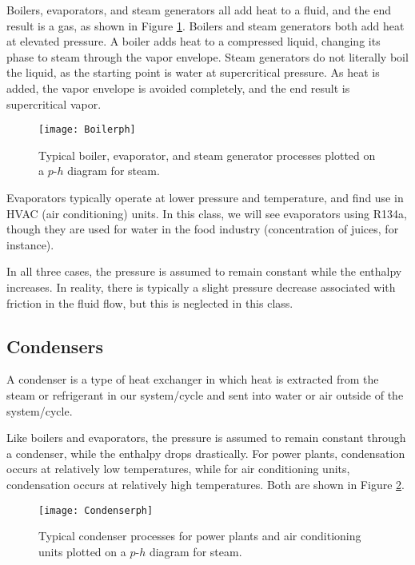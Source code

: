 Boilers, evaporators, and steam generators all add heat to a fluid, and the end result is a gas, as shown in Figure \ref{fig:ch4_boilerph}.  Boilers and steam generators both add heat at elevated pressure.  A boiler adds heat to a compressed liquid, changing its phase to steam through the vapor envelope.  Steam generators do not literally boil the liquid, as the starting point is water at supercritical pressure.  As heat is added, the vapor envelope is avoided completely, and the end result is supercritical vapor.

\begin{figure}[H]
\centering
\texttt{[image: Boilerph]}
\caption{Typical boiler, evaporator, and steam generator processes plotted on a $p$-$h$ diagram for steam.}
\label{fig:ch4_boilerph}
\end{figure}

Evaporators typically operate at lower pressure and temperature, and find use in HVAC (air conditioning) units.  In this class, we will see evaporators using R134a, though they are used for water in the food industry (concentration of juices, for instance).

In all three cases, the pressure is assumed to remain constant while the enthalpy increases.  In reality, there is typically a slight pressure decrease associated with friction in the fluid flow, but this is neglected in this class.
\subsection{Condensers}  \label{sec:ch4_condensers}

A condenser is a type of heat exchanger in which heat is extracted from the steam or refrigerant in our system/cycle and sent into water or air outside of the system/cycle.

Like boilers and evaporators, the pressure is assumed to remain constant through a condenser, while the enthalpy drops drastically.  For power plants, condensation occurs at relatively low temperatures, while for air conditioning units, condensation occurs at relatively high temperatures.  Both are shown in Figure \ref{fig:ch4_condenserph}.

\begin{figure}[H]
\centering
\texttt{[image: Condenserph]}
\caption{Typical condenser processes for power plants and air conditioning units plotted on a $p$-$h$ diagram for steam.}
\label{fig:ch4_condenserph}
\end{figure}

